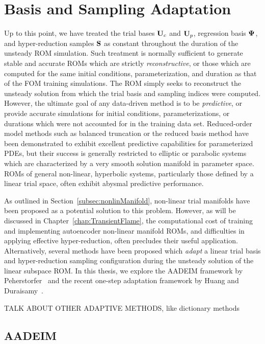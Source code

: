 \section{Basis and Sampling Adaptation}\label{sec:adaptation}

Up to this point, we have treated the trial bases $\consTrial$ and $\primTrial$, regression basis $\deimBasis$, and hyper-reduction samples $\mathbf{S}$ as constant throughout the duration of the unsteady ROM simulation. Such treatment is normally sufficient to generate stable and accurate ROMs which are strictly \textit{reconstructive}, or those which are computed for the same initial conditions, parameterization, and duration as that of the FOM training simulations. The ROM simply seeks to reconstruct the unsteady solution from which the trial basis and sampling indices were computed. However, the ultimate goal of any data-driven method is to be \textit{predictive}, or provide accurate simulations for initial conditions, parameterizations, or durations which were not accounted for in the training data set. Reduced-order model methods such as balanced truncation or the reduced basis method have been demonstrated to exhibit excellent predictive capabilities for parameterized PDEs, but their success is generally restricted to elliptic or parabolic systems which are characterized by a very smooth solution manifold in parameter space. ROMs of general non-linear, hyperbolic systems, particularly those defined by a linear trial space, often exhibit abysmal predictive performance.

As outlined in Section~\ref{subsec:nonlinManifold}, non-linear trial manifolds have been proposed as a potential solution to this problem. However, as will be discussed in Chapter~\ref{chap:TransientFlame}, the computational cost of training and implementing autoencoder non-linear manifold ROMs, and difficulties in applying effective hyper-reduction, often precludes their useful application. Alternatively, several methods have been proposed which \textit{adapt} a linear trial basis and hyper-reduction sampling configuration during the unsteady solution of the linear subspace ROM. In this thesis, we explore the AADEIM framework by Peherstorfer~\cite{Peherstorfer2015} and the recent one-step adaptation framework by Huang and Duraisamy~\cite{Huang2022a}.

{\color{red}TALK ABOUT OTHER ADAPTIVE METHODS, like dictionary methods}

\subsection{AADEIM}

